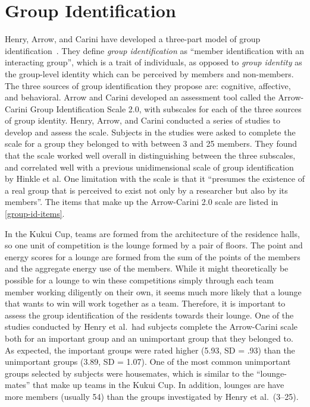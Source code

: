 \section{Group Identification}

Henry, Arrow, and Carini have developed a three-part model of group identification~\cite{Henry1999}. They define \emph{group identification} as ``member identification with an interacting group'', which is a trait of individuals, as opposed to \emph{group identity} as the group-level identity which can be perceived by members and non-members. The three sources of group identification they propose are: cognitive, affective, and behavioral. Arrow and Carini developed an assessment tool called the Arrow-Carini Group Identification Scale 2.0, with subscales for each of the three sources of group identity. Henry, Arrow, and Carini conducted a series of studies to develop and assess the scale. Subjects in the studies were asked to complete the scale for a group they belonged to with between 3 and 25 members. They found that the scale worked well overall in distinguishing between the three subscales, and correlated well with a previous unidimensional scale of group identification by Hinkle et al. One limitation with the scale is that it ``presumes the existence of a real group that is perceived to exist not only by a researcher but also by its members''. The items that make up the Arrow-Carini 2.0 scale are listed in \autoref{group-id-items}.

In the Kukui Cup, teams are formed from the architecture of the residence halls, so one unit of competition is the lounge formed by a pair of floors. The point and energy scores for a lounge are formed from the sum of the points of the members and the aggregate energy use of the members. While it might theoretically be possible for a lounge to win these competitions simply through each team member working diligently on their own, it seems much more likely that a lounge that wants to win will work together as a team. Therefore, it is important to assess the group identification of the residents towards their lounge. One of the studies conducted by Henry et al.\ had subjects complete the Arrow-Carini scale both for an important group and an unimportant group that they belonged to. As expected, the important groups were rated higher (5.93, SD = .93) than the unimportant groups (3.89, SD = 1.07). One of the most common unimportant groups selected by subjects were housemates, which is similar to the ``lounge-mates'' that make up teams in the Kukui Cup. In addition, lounges are have more members (usually 54) than the groups investigated by Henry et al.\ (3--25).


